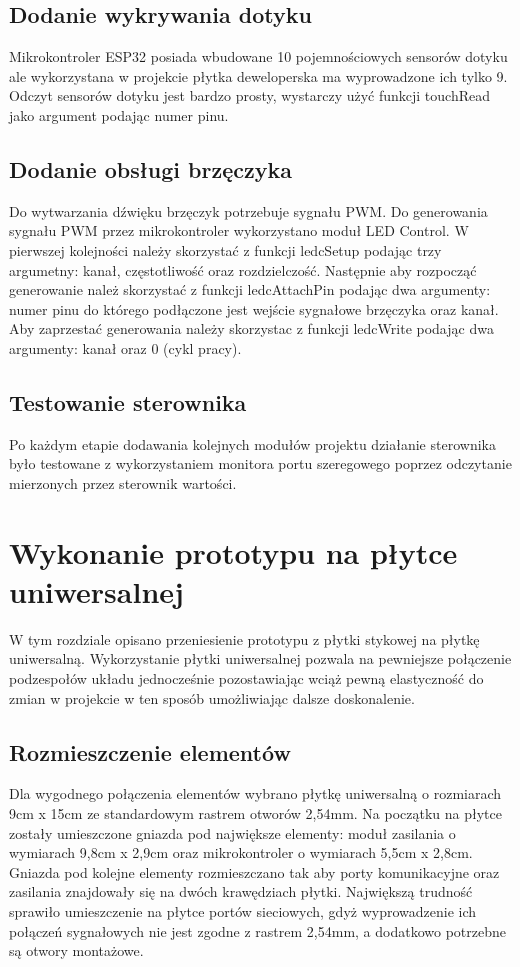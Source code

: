 \documentclass[11pt]{report}
\begin{document}
 \section{Dodanie wykrywania dotyku}
 Mikrokontroler ESP32 posiada wbudowane 10 pojemnościowych sensorów dotyku ale wykorzystana w projekcie płytka deweloperska ma wyprowadzone ich tylko 9. Odczyt sensorów dotyku jest bardzo prosty, wystarczy użyć funkcji touchRead jako argument podając numer pinu.
 
 \section{Dodanie obsługi brzęczyka}
 Do wytwarzania dźwięku brzęczyk potrzebuje sygnału PWM. Do generowania sygnału PWM przez mikrokontroler wykorzystano moduł LED Control. W pierwszej kolejności należy skorzystać z funkcji ledcSetup podając trzy argumetny: kanał, częstotliwość oraz rozdzielczość. Następnie aby rozpocząć generowanie należ skorzystać z funkcji ledcAttachPin podając dwa argumenty: numer pinu do którego podłączone jest wejście sygnałowe brzęczyka oraz kanał.
 Aby zaprzestać generowania należy skorzystac z funkcji ledcWrite podając dwa argumenty: kanał oraz 0 (cykl pracy).
 
 \section{Testowanie sterownika}
 Po każdym etapie dodawania kolejnych modułów projektu działanie sterownika było testowane z wykorzystaniem monitora portu szeregowego poprzez odczytanie mierzonych przez sterownik wartości.

 
 \chapter{Wykonanie prototypu na płytce uniwersalnej}
 W tym rozdziale opisano przeniesienie prototypu z płytki stykowej na płytkę uniwersalną.
 Wykorzystanie płytki uniwersalnej pozwala na pewniejsze połączenie podzespołów układu jednocześnie pozostawiając wciąż pewną elastyczność do zmian w projekcie w ten sposób umożliwiając dalsze doskonalenie.
 
 \section{Rozmieszczenie elementów}
 Dla wygodnego połączenia elementów wybrano płytkę uniwersalną o rozmiarach 9cm x 15cm ze standardowym rastrem otworów 2,54mm.
 Na początku na płytce zostały umieszczone gniazda pod największe elementy: moduł zasilania o wymiarach 9,8cm x 2,9cm oraz mikrokontroler o wymiarach 5,5cm x 2,8cm. Gniazda pod kolejne elementy rozmieszczano tak aby porty komunikacyjne oraz zasilania znajdowały się na dwóch krawędziach płytki. 
 Największą trudność sprawiło umieszczenie na płytce portów sieciowych, gdyż wyprowadzenie ich połączeń sygnałowych nie jest zgodne z rastrem 2,54mm, a dodatkowo potrzebne są otwory montażowe.
  
\end{document}
